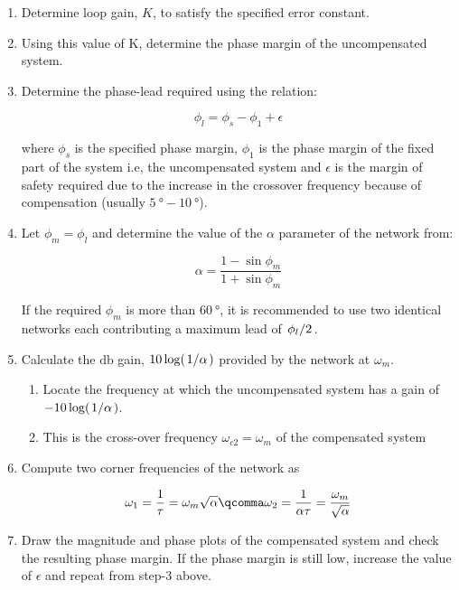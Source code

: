 \documentclass[
  14pt,
  a4paper,
  oneside,
  open=any,
  a4paper,
  14pt]{report}
\begin{document}
\begin{enumerate}
\def\labelenumi{\arabic{enumi}.}
\item
  Determine loop gain, \(K\), to satisfy the specified error constant.
\item
  Using this value of K, determine the phase margin of the uncompensated
  system.
\item
  Determine the phase-lead required using the relation:

  \[
  \phi_l = \phi_s - \phi_1 + \epsilon
  \]

  where \(\phi_s\) is the specified phase margin, \(\phi_1\) is the
  phase margin of the fixed part of the system i.e, the uncompensated
  system and \(\epsilon\) is the margin of safety required due to the
  increase in the crossover frequency because of compensation (usually
  \(\SI{5}{\degree} - \SI{10}{\degree}\)).
\item
  Let \(\phi_m = \phi_l\) and determine the value of the \(\alpha\)
  parameter of the network from:

  \[
  \alpha = \dfrac{1-\sin\phi_m}{1+\sin\phi_m}
  \]

  If the required \(\phi_m\) is more than \(\SI{60}{\degree}\), it is
  recommended to use two identical networks each contributing a maximum
  lead of \(\left.\phi_l\middle\slash2\right.\).
\item
  Calculate the \(\unit{\decibel}\) gain,
  \(10\log(\left.1\middle\slash\alpha\right.)\) provided by the network at
  \(\omega_m\).

  \begin{enumerate}
  \def\labelenumii{\alph{enumii})}
  \item
    Locate the frequency at which the uncompensated system has a gain of
    \(-10\log(\left.1\middle\slash\alpha\right.)\).
  \item
    This is the cross-over frequency \(\omega_{c2} = \omega_m\) of the
    compensated system
  \end{enumerate}
\item
  Compute two corner frequencies of the network as

  \[
  \omega_1 = \dfrac{1}{\tau}=\omega_m \sqrt{\alpha}\qcomma \omega_2 = \dfrac{1}{\alpha\tau} = \dfrac{\omega_m}{\sqrt{\alpha}}
  \]
\item
  Draw the magnitude and phase plots of the compensated system and check
  the resulting phase margin. If the phase margin is still low, increase
  the value of \(\epsilon\) and repeat from step-3 above.
\end{enumerate}
\end{document}
